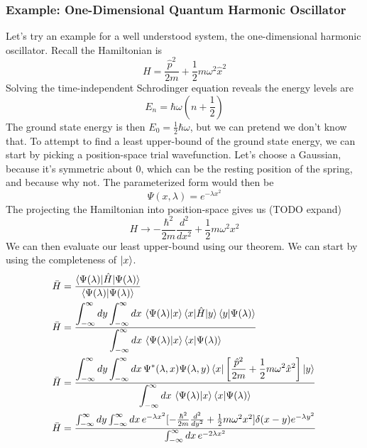 \documentclass[12pt]{article}
\numberwithin{equation}{section}
\begin{document}
\subsubsection{Example: One-Dimensional Quantum Harmonic Oscillator}
Let's try an example for a well understood system, the one-dimensional harmonic oscillator. Recall the Hamiltonian is
\begin{equation}
    H = \frac{\hat{p}^2}{2m} + \frac{1}{2}m\omega^2\hat{x}^2
\end{equation}
Solving the time-independent Schrodinger equation reveals the energy levels are
\begin{equation}
    E_n = \hbar\omega (n + \frac{1}{2})
\end{equation}
The ground state energy is then $E_0 = \frac{1}{2}\hbar\omega$, but we can pretend we don't know that. To attempt to find a least upper-bound of the ground state energy, we can start by picking a position-space trial wavefunction. Let's choose a Gaussian, because it's symmetric about 0, which can be the resting position of the spring, and because why not. The parameterized form would then be
\begin{equation}
    \Psi(x, \lambda) = e^{-\lambda x^2}
\end{equation}
The projecting the Hamiltonian into position-space gives us (TODO expand)
\begin{equation}
    H \rightarrow -\frac{\hbar^2}{2m}\frac{d^2}{d x^2} + \frac{1}{2}m\omega^2 x^2
\end{equation}
We can then evaluate our least upper-bound using our theorem. We can start by using the completeness of $\ket{x}$. 
\begin{align}
    \bar{H} &= \frac{\braket{\Psi(\lambda) | \hat{H} | \Psi(\lambda)}}{\braket{\Psi(\lambda) | \Psi(\lambda)}}\\
    \bar{H} &= \frac{\displaystyle \int_{-\infty}^{\infty} dy \int_{-\infty}^{\infty} dx \, \braket{\Psi(\lambda) | x}\braket{x | \hat{H} | y} \braket{y | \Psi(\lambda)}}{\displaystyle \int_{-\infty}^{\infty} dx \, \braket{\Psi(\lambda) | x}\braket{x | \Psi(\lambda)}}\\
    \bar{H} &= \frac{\displaystyle \int_{-\infty}^{\infty} dy \int_{-\infty}^{\infty} dx \, \Psi^*(\lambda, x) \Psi(\lambda, y) \braket{x | \left[\frac{\hat{p}^2}{2m} + \frac{1}{2}m\omega^2\hat{x}^2\right] | y}}{\displaystyle \int_{-\infty}^{\infty} dx \, \braket{\Psi(\lambda) | x}\braket{x | \Psi(\lambda)}}\\
    \bar{H} &= \frac{\int_{-\infty}^{\infty} dy \int_{-\infty}^{\infty} dx \, e^{-\lambda x^2}[-\frac{\hbar^2}{2m}\frac{d^2}{dy^2} + \frac{1}{2}m\omega^2x^2]\delta(x-y)e^{-\lambda y^2}}{\int_{-\infty}^{\infty} dx \, e^{-2\lambda x^2}}\\
\end{align}
\end{document}
